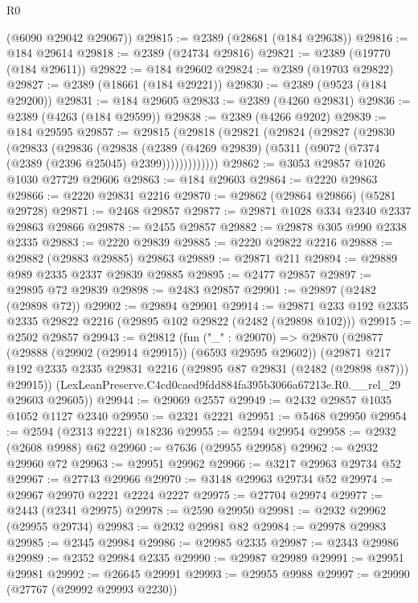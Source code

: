 \begin{lexlean}{R0}
\begin{coremodule}
      (@6090 @29042 @29067))
@29815 := @2389 (@28681 (@184 @29638))
@29816 := @184 @29614
@29818 := @2389 (@24734 @29816)
@29821 := @2389 (@19770 (@184 @29611))
@29822 := @184 @29602
@29824 := @2389 (@19703 @29822)
@29827 := @2389 (@18661 (@184 @29221))
@29830 := @2389 (@9523 (@184 @29200))
@29831 := @184 @29605
@29833 := @2389 (@4260 @29831)
@29836 := @2389 (@4263 (@184 @29599))
@29838 := @2389 (@4266 @9202)
@29839 := @184 @29595
@29857 := @29815
    (@29818
      (@29821
        (@29824
          (@29827
            (@29830
              (@29833
                (@29836
                  (@29838
                    (@2389
                      (@4269 @29839)
                      (@5311 (@9072 (@7374 (@2389 (@2396 @25045) @2399)))))))))))))
@29862 := @3053 @29857 @1026 @1030 @27729 @29606
@29863 := @184 @29603
@29864 := @2220 @29863
@29866 := @2220 @29831 @2216
@29870 := @29862 (@29864 @29866) (@5281 @29728)
@29871 := @2468 @29857
@29877 := @29871 @1028 @334 @2340 @2337 @29863 @29866
@29878 := @2455 @29857
@29882 := @29878 @305 @990 @2338 @2335
@29883 := @2220 @29839
@29885 := @2220 @29822 @2216
@29888 := @29882 (@29883 @29885) @29863
@29889 := @29871 @211
@29894 := @29889 @989 @2335 @2337 @29839 @29885
@29895 := @2477 @29857
@29897 := @29895 @72 @29839
@29898 := @2483 @29857
@29901 := @29897 (@2482 (@29898 @72))
@29902 := @29894 @29901
@29914 := @29871 @233 @192 @2335 @2335 @29822 @2216 (@29895 @102 @29822 (@2482 (@29898 @102)))
@29915 := @2502 @29857
@29943 := @29812
    (fun ("_" : @29070) =>
    @29870
      (@29877
        (@29888 (@29902 (@29914 @29915)) (@6593 @29595 @29602))
        (@29871 @217 @192 @2335 @2335 @29831 @2216 (@29895 @87 @29831 (@2482 (@29898 @87))) @29915))
      (LexLeanPreserve.C4cd0caed9fdd884fa395b3066a67213e.R0.__rel_29 @29603 @29605))
@29944 := @29069 @2557
@29949 := @2432 @29857 @1035 @1052 @1127 @2340
@29950 := @2321 @2221
@29951 := @5468 @29950
@29954 := @2594 (@2313 @2221) @18236
@29955 := @2594 @29954
@29958 := @2932 (@2608 @9988) @62
@29960 := @7636 (@29955 @29958)
@29962 := @2932 @29960 @72
@29963 := @29951 @29962
@29966 := @3217 @29963 @29734 @52
@29967 := @27743 @29966
@29970 := @3148 @29963 @29734 @52
@29974 := @29967 @29970 @2221 @2224 @2227
@29975 := @27704 @29974
@29977 := @2443 (@2341 @29975)
@29978 := @2590 @29950
@29981 := @2932 @29962 (@29955 @29734)
@29983 := @2932 @29981 @82
@29984 := @29978 @29983
@29985 := @2345 @29984
@29986 := @29985 @2335
@29987 := @2343 @29986
@29989 := @2352 @29984 @2335
@29990 := @29987 @29989
@29991 := @29951 @29981
@29992 := @26645 @29991
@29993 := @29955 @9988
@29997 := @29990 (@27767 (@29992 @29993 @2230))

\end{coremodule}
\end{lexlean}
